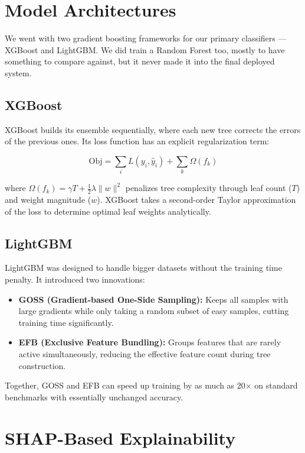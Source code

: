 \documentclass[12pt,a4paper]{report}
\begin{document}
\section{Model Architectures}

We went with two gradient boosting frameworks for our primary classifiers --- XGBoost and LightGBM. We did train a Random Forest too, mostly to have something to compare against, but it never made it into the final deployed system.

\subsection{XGBoost}

XGBoost builds its ensemble sequentially, where each new tree corrects the errors of the previous ones. Its loss function has an explicit regularization term:

\begin{equation}
\text{Obj} = \sum_{i} L(y_i, \hat{y}_i) + \sum_{k} \Omega(f_k)
\end{equation}

where $\Omega(f_k) = \gamma T + \tfrac{1}{2}\lambda \|w\|^2$ penalizes tree complexity through leaf count ($T$) and weight magnitude ($w$). XGBoost takes a second-order Taylor approximation of the loss to determine optimal leaf weights analytically.

\subsection{LightGBM}

LightGBM was designed to handle bigger datasets without the training time penalty. It introduced two innovations:
\begin{itemize}
    \item \textbf{GOSS (Gradient-based One-Side Sampling):} Keeps all samples with large gradients while only taking a random subset of easy samples, cutting training time significantly.
    \item \textbf{EFB (Exclusive Feature Bundling):} Groups features that are rarely active simultaneously, reducing the effective feature count during tree construction.
\end{itemize}

Together, GOSS and EFB can speed up training by as much as 20$\times$ on standard benchmarks with essentially unchanged accuracy.

\section{SHAP-Based Explainability}
\end{document}
